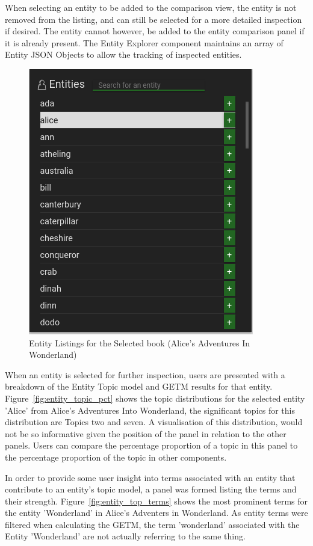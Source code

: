 \documentclass[10pt]{report}
\begin{document}
When selecting an entity to be added to the comparison view, the entity is not removed from the listing, and can still be selected for a more detailed inspection if desired. The entity cannot however, be added to the entity comparison panel if it is already present. The Entity Explorer component maintains an array of Entity JSON Objects to allow the tracking of inspected entities.
\begin{figure}[h]
  \centering
  \includegraphics[scale=0.4]{entity_listing}
  \caption{Entity Listings for the Selected book (Alice's Adventures In Wonderland)\label{fig:entity_listing}}
\end{figure}

When an entity is selected for further inspection, users are presented with a breakdown of the Entity Topic model and GETM results for that entity. Figure~\ref{fig:entity_topic_pct} shows the topic distributions for the selected entity 'Alice' from Alice's Adventures Into Wonderland, the significant topics for this distribution are Topics two and seven. A visualisation of this distribution, would not be so informative given the position of the panel in relation to the other panels. Users can compare the percentage proportion of a topic in this panel to the percentage proportion of the topic in other components.

In order to provide some user insight into terms associated with an entity that contribute to an entity's topic model, a panel was formed listing the terms and their strength. Figure~\ref{fig:entity_top_terms} shows the most prominent terms for the entity 'Wonderland' in Alice's Adventers in Wonderland.  As entity terms were filtered when calculating the GETM, the term 'wonderland' associated with the Entity 'Wonderland' are not actually referring to the same thing.
\end{document}

